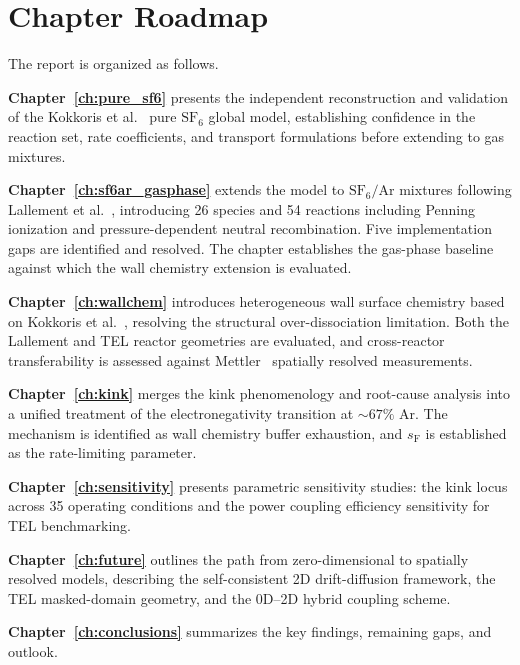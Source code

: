 \documentclass[11pt,a4paper]{report}
\newcommand{\SFsix}{\mathrm{SF}_6}
\newcommand{\Ar}{\mathrm{Ar}}
\begin{document}
\section{Chapter Roadmap}
\label{sec:intro_roadmap}

The report is organized as follows.

\textbf{Chapter~\ref{ch:pure_sf6}} presents the independent reconstruction and validation of the Kokkoris et al.~\cite{Kokkoris2009} pure $\SFsix$ global model, establishing confidence in the reaction set, rate coefficients, and transport formulations before extending to gas mixtures.

\textbf{Chapter~\ref{ch:sf6ar_gasphase}} extends the model to $\SFsix/\Ar$ mixtures following Lallement et al.~\cite{Lallement2009}, introducing 26 species and 54 reactions including Penning ionization and pressure-dependent neutral recombination.  Five implementation gaps are identified and resolved.  The chapter establishes the gas-phase baseline against which the wall chemistry extension is evaluated.

\textbf{Chapter~\ref{ch:wallchem}} introduces heterogeneous wall surface chemistry based on Kokkoris et al.~\cite{Kokkoris2009}, resolving the structural over-dissociation limitation.  Both the Lallement and TEL reactor geometries are evaluated, and cross-reactor transferability is assessed against Mettler~\cite{Mettler2025} spatially resolved measurements.

\textbf{Chapter~\ref{ch:kink}} merges the kink phenomenology and root-cause analysis into a unified treatment of the electronegativity transition at ${\sim}67\%$ Ar.  The mechanism is identified as wall chemistry buffer exhaustion, and $s_\mathrm{F}$ is established as the rate-limiting parameter.

\textbf{Chapter~\ref{ch:sensitivity}} presents parametric sensitivity studies: the kink locus across 35 operating conditions and the power coupling efficiency sensitivity for TEL benchmarking.

\textbf{Chapter~\ref{ch:future}} outlines the path from zero-dimensional to spatially resolved models, describing the self-consistent 2D drift-diffusion framework, the TEL masked-domain geometry, and the 0D--2D hybrid coupling scheme.

\textbf{Chapter~\ref{ch:conclusions}} summarizes the key findings, remaining gaps, and outlook.
\end{document}
